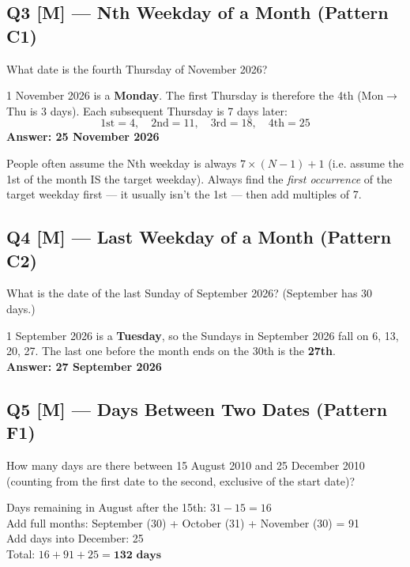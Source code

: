\documentclass[11pt]{article}
\begin{document}
\subsection*{Q3 [M] --- Nth Weekday of a Month (Pattern C1)}
What date is the fourth Thursday of November 2026?

\begin{tipbox}[Solution]
1 November 2026 is a \textbf{Monday}. The first Thursday is therefore the 4th (Mon$\to$Thu is 3
days). Each subsequent Thursday is 7 days later:
\[
\text{1st} = 4,\quad \text{2nd} = 11,\quad \text{3rd} = 18,\quad \text{4th} = 25
\]
\textbf{Answer: 25 November 2026}
\end{tipbox}

\begin{warnbox}
People often assume the Nth weekday is always $7\times(N-1)+1$ (i.e. assume the 1st of the month IS
the target weekday). Always find the \emph{first occurrence} of the target weekday first --- it
usually isn't the 1st --- then add multiples of 7.
\end{warnbox}

\subsection*{Q4 [M] --- Last Weekday of a Month (Pattern C2)}
What is the date of the last Sunday of September 2026? (September has 30 days.)

\begin{tipbox}[Solution]
1 September 2026 is a \textbf{Tuesday}, so the Sundays in September 2026 fall on 6, 13, 20, 27. The
last one before the month ends on the 30th is the \textbf{27th}.\\
\textbf{Answer: 27 September 2026}
\end{tipbox}

\subsection*{Q5 [M] --- Days Between Two Dates (Pattern F1)}
How many days are there between 15 August 2010 and 25 December 2010 (counting from the first date to
the second, exclusive of the start date)?

\begin{tipbox}[Solution]
Days remaining in August after the 15th: $31-15=16$ \\
Add full months: September (30) + October (31) + November (30) = 91 \\
Add days into December: 25 \\
Total: $16+91+25 = \textbf{132 days}$
\end{tipbox}
\end{document}
